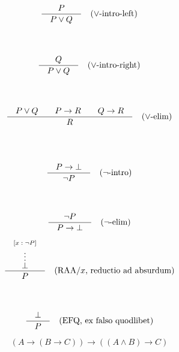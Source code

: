 \begin{frame}{}
  \begin{gather*}
    \frac{\quad P\quad}{\quad P \lor Q\quad} \quad (\lor\text{-intro-left}) \\[35pt]
    \frac{\quad Q\quad}{\quad P \lor Q\quad} \quad (\lor\text{-intro-right}) \\[35pt]
    \frac{\quad P \lor Q \qquad P \to R \qquad Q \to R\quad}{\quad R\quad} \quad (\lor\text{-elim}) \\[35pt]
  \end{gather*}
\end{frame}

\begin{frame}{}
  \begin{gather*}
    \frac{\quad P \to \bot\quad}{\quad\lnot P\quad} \quad (\lnot\text{-intro}) \\[35pt]
    \frac{\quad\lnot P\quad}{\quad P \to \bot\quad} \quad (\lnot\text{-elim})
  \end{gather*}
\end{frame}

\begin{frame}{}
  \begin{gather*}
    \frac{\quad\stackrel{[x \;:\; \lnot P]}{\stackrel{\vdots}{\bot}}\quad}{\quad P\quad} \quad (
      \text{RAA}/x \text{, reductio ad absurdum}) \\[35pt]
    \frac{\quad\bot\quad}{\quad P\quad} \quad (\text{EFQ, ex falso quodlibet})
  \end{gather*}
\end{frame}

\begin{frame}{}
  \[
    (A \to (B \to C)) \to ((A \land B) \to C)
  \]

  \pause
\end{frame}

\begin{frame}{}
\end{frame}
